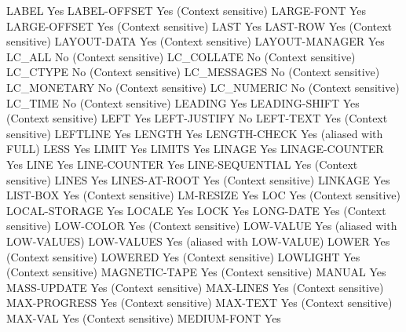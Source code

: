 LABEL                           Yes
LABEL-OFFSET                    Yes (Context sensitive)
LARGE-FONT                      Yes
LARGE-OFFSET                    Yes (Context sensitive)
LAST                            Yes
LAST-ROW                        Yes (Context sensitive)
LAYOUT-DATA                     Yes (Context sensitive)
LAYOUT-MANAGER                  Yes
LC_ALL                          No (Context sensitive)
LC_COLLATE                      No (Context sensitive)
LC_CTYPE                        No (Context sensitive)
LC_MESSAGES                     No (Context sensitive)
LC_MONETARY                     No (Context sensitive)
LC_NUMERIC                      No (Context sensitive)
LC_TIME                         No (Context sensitive)
LEADING                         Yes
LEADING-SHIFT                   Yes (Context sensitive)
LEFT                            Yes
LEFT-JUSTIFY                    No
LEFT-TEXT                       Yes (Context sensitive)
LEFTLINE                        Yes
LENGTH                          Yes
LENGTH-CHECK                    Yes (aliased with FULL)
LESS                            Yes
LIMIT                           Yes
LIMITS                          Yes
LINAGE                          Yes
LINAGE-COUNTER                  Yes
LINE                            Yes
LINE-COUNTER                    Yes
LINE-SEQUENTIAL                 Yes (Context sensitive)
LINES                           Yes
LINES-AT-ROOT                   Yes (Context sensitive)
LINKAGE                         Yes
LIST-BOX                        Yes (Context sensitive)
LM-RESIZE                       Yes
LOC                             Yes (Context sensitive)
LOCAL-STORAGE                   Yes
LOCALE                          Yes
LOCK                            Yes
LONG-DATE                       Yes (Context sensitive)
LOW-COLOR                       Yes (Context sensitive)
LOW-VALUE                       Yes (aliased with LOW-VALUES)
LOW-VALUES                      Yes (aliased with LOW-VALUE)
LOWER                           Yes (Context sensitive)
LOWERED                         Yes (Context sensitive)
LOWLIGHT                        Yes (Context sensitive)
MAGNETIC-TAPE                   Yes (Context sensitive)
MANUAL                          Yes
MASS-UPDATE                     Yes (Context sensitive)
MAX-LINES                       Yes (Context sensitive)
MAX-PROGRESS                    Yes (Context sensitive)
MAX-TEXT                        Yes (Context sensitive)
MAX-VAL                         Yes (Context sensitive)
MEDIUM-FONT                     Yes
